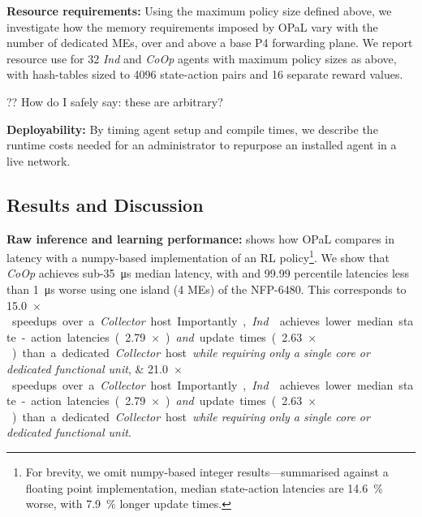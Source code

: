 \documentclass[sigconf,natbib=false]{acmart}
\newcommand{\fakepara}[1]{\noindent\textbf{#1:}}
\newcommand{\approachshort}{OPaL}
\newcommand{\Coopfw}{\emph{CoOp}}
\newcommand{\Indfw}{\emph{Ind}}
\begin{document}
\fakepara{Resource requirements}
Using the maximum policy size defined above, we investigate how the memory requirements imposed by \approachshort{} vary with the number of dedicated MEs, over and above a base P4 forwarding plane.
We report resource use for \SI{32}{\bit} \Indfw{} and \Coopfw{} agents with maximum policy sizes as above, with hash-tables sized to \num{4096} state-action pairs and \num{16} separate reward values.

?? How do I safely say: these are arbitrary?


\fakepara{Deployability}
By timing agent setup and compile times, we describe the runtime costs needed for an administrator to repurpose an installed agent in a live network.

\subsection{Results and Discussion}\label{sec:results}
\fakepara{Raw inference and learning performance}
 shows how \approachshort{} compares in latency with a numpy-based implementation of an RL policy\footnote{For brevity, we omit numpy-based integer results---summarised against a floating point implementation, median state-action latencies are \SI{14.6}{\percent} worse, with \SI{7.9}{\percent} longer update times.}.
We show that \Coopfw{} achieves sub-\SI{35}{\micro\second} median latency, with  and \num{99.99} percentile latencies less than \SI{1}{\micro\second} worse using one island (4 MEs) of the NFP-6480.
This corresponds to \SIlist{15.0;21.0}{$\times$} speedups over a \emph{Collector} host.
Importantly, \Indfw{} achieves lower median state-action latencies (\SI{2.79}{$\times$}) \emph{and} update times (\SI{2.63}{$\times$}) than a dedicated \emph{Collector} host \emph{while requiring only a single core or dedicated functional unit}.

\begin{table}
	\caption{Latencies and computation times for \approachshort{} versus commodity hardware hosts. On-device execution is crucial in not only lowering latencies, but in reducing tail latencies. Lower is better, with the best marked \emph{in bold}.\label{tab:lats}}
\end{table}
\end{document}
